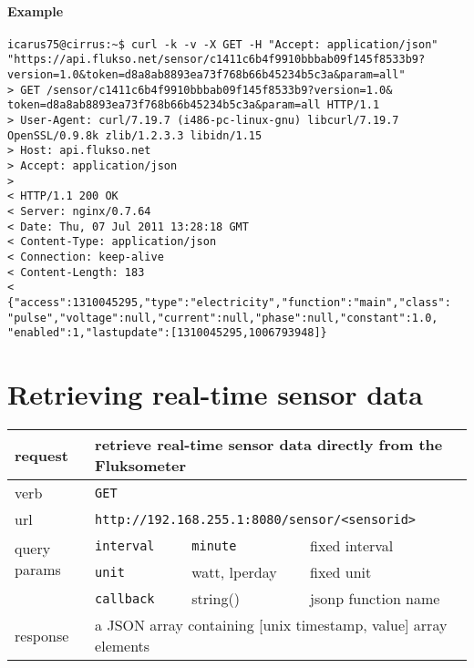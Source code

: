\paragraph{Example}
\begin{Verbatim}
icarus75@cirrus:~$ curl -k -v -X GET -H "Accept: application/json"
"https://api.flukso.net/sensor/c1411c6b4f9910bbbab09f145f8533b9?
version=1.0&token=d8a8ab8893ea73f768b66b45234b5c3a&param=all"
> GET /sensor/c1411c6b4f9910bbbab09f145f8533b9?version=1.0&
token=d8a8ab8893ea73f768b66b45234b5c3a&param=all HTTP/1.1
> User-Agent: curl/7.19.7 (i486-pc-linux-gnu) libcurl/7.19.7
OpenSSL/0.9.8k zlib/1.2.3.3 libidn/1.15
> Host: api.flukso.net
> Accept: application/json
> 
< HTTP/1.1 200 OK
< Server: nginx/0.7.64
< Date: Thu, 07 Jul 2011 13:28:18 GMT
< Content-Type: application/json
< Connection: keep-alive
< Content-Length: 183
< 
{"access":1310045295,"type":"electricity","function":"main","class":
"pulse","voltage":null,"current":null,"phase":null,"constant":1.0,
"enabled":1,"lastupdate":[1310045295,1006793948]}
\end{Verbatim}

\section{Retrieving real-time sensor data}
\begin{tabular}{|l|l|l|p{5cm}|}

\hline
request & \multicolumn{3}{|l|}{retrieve real-time sensor data directly from the Fluksometer} \\

\hline
verb & \multicolumn{3}{|l|}{\texttt{GET}} \\

\hline
url & \multicolumn{3}{|l|}{\texttt{http://192.168.255.1:8080/sensor/\textless sensorid\textgreater}} \\

\hline
\multirow{2}{*}{query params} & \texttt{interval} & \texttt{minute} & fixed interval \\
& \texttt{unit} & watt, lperday & fixed unit \\
& \texttt{{\small callback}} & string() & jsonp function name \\

\hline
response & \multicolumn{3}{|l|}{a JSON array containing [unix timestamp, value] array elements} \\

\hline

\end{tabular}

